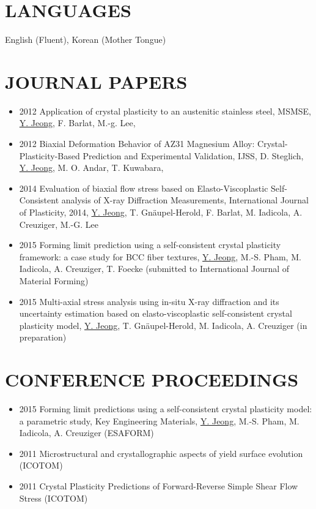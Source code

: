 \documentclass{res}
\begin{document}
\begin{resume}
  \section{LANGUAGES}
  English (Fluent), Korean (Mother Tongue)

  \section{JOURNAL PAPERS}
  \begin{itemize}
  \item 2012 Application of crystal plasticity to an austenitic stainless steel, MSMSE, \underline{Y. Jeong}, F. Barlat, M.-g. Lee,
  \item 2012 Biaxial Deformation Behavior of AZ31 Magnesium Alloy: Crystal-Plasticity-Based Prediction and Experimental Validation, IJSS, D. Steglich, \underline{Y. Jeong}, M. O. Andar, T. Kuwabara,
  \item 2014 Evaluation of biaxial flow stress based on Elasto-Viscoplastic Self-Consistent analysis of X-ray Diffraction Measurements, International Journal of Plasticity, 2014, \underline{Y. Jeong}, T. Gn\"{a}upel-Herold, F. Barlat, M. Iadicola, A. Creuziger, M.-G. Lee
  \item 2015 Forming limit prediction using a self-consistent crystal plasticity framework: a case study for BCC fiber textures, \underline{Y. Jeong}, M.-S. Pham, M. Iadicola, A. Creuziger, T. Foecke (submitted to International Journal of Material Forming)
  \item 2015 Multi-axial stress analysis using in-situ X-ray diffraction and its uncertainty estimation based on elasto-viscoplastic self-consistent crystal plasticity model, \underline{Y. Jeong}, T. Gn\"{a}upel-Herold, M. Iadicola, A. Creuziger (in preparation)
  \end{itemize}

  \section{CONFERENCE PROCEEDINGS}
  \begin{itemize}
  \item 2015 Forming limit predictions using a self-consistent crystal plasticity model: a parametric study, Key Engineering Materials, \underline{Y. Jeong}, M.-S. Pham, M. Iadicola, A. Creuziger (ESAFORM)
  \item 2011 Microstructural and crystallographic aspects of yield surface evolution (ICOTOM)
  \item 2011 Crystal Plasticity Predictions of Forward-Reverse Simple Shear Flow Stress (ICOTOM)
  \end{itemize}


\end{resume}
\end{document}
